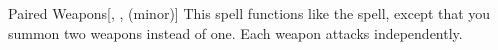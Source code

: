 \lowercase{\hypertarget{spell:Paired Weapons}{}}\label{spell:Paired Weapons}
\begin{freeability}[\nth{7}]{\hypertarget{spell:Paired Weapons}{Paired Weapons}}[, ,  (minor)]
This spell functions like the  spell, except that you summon two weapons instead of one.
Each weapon attacks independently.
\end{freeability}
\vspace{0.25em}

